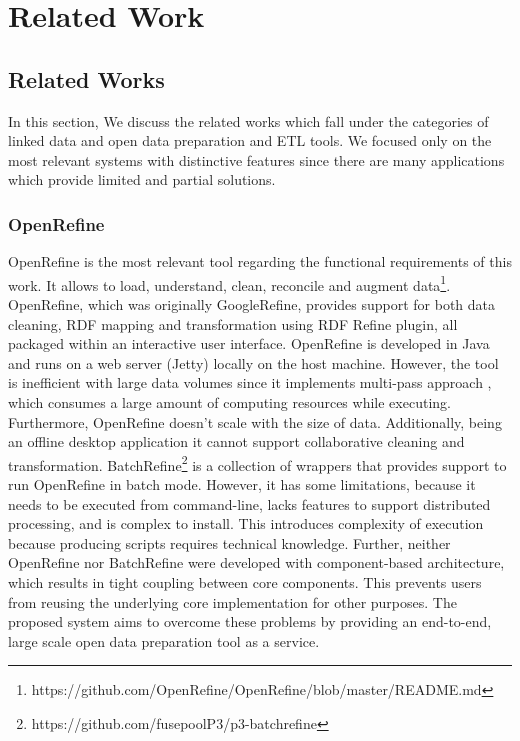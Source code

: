 
\chapter{Related Work} %
\label{Chapter2} %


\section{Related Works}
\label{sec:relatedwork}
In this section, We discuss the related works which fall under the categories of linked data and open data preparation and ETL tools. We focused only on the most relevant systems with distinctive features since there are many applications which provide limited and partial solutions.
\subsection{OpenRefine}
OpenRefine is the most relevant tool regarding the functional requirements of this work. It allows to load, understand, clean, reconcile and augment data\footnote{https://github.com/OpenRefine/OpenRefine/blob/master/README.md}. OpenRefine, which was originally GoogleRefine, provides support for both data cleaning, RDF mapping and transformation using RDF Refine plugin, all packaged within an interactive user interface. OpenRefine is developed in Java and runs on a web server (Jetty) locally on the  host machine. However, the tool is inefficient with large data volumes since it implements multi-pass approach \cite{onestopshotforopendata}, which consumes a large amount of computing resources while executing. Furthermore, OpenRefine doesn't scale with the size of data. Additionally, being an offline desktop application it cannot support collaborative cleaning and transformation.  BatchRefine\footnote{https://github.com/fusepoolP3/p3-batchrefine} is a collection of wrappers that provides support to run OpenRefine in batch mode. However, it has some limitations, because it needs to be executed from command-line, lacks features to support distributed processing, and is complex to install. This introduces complexity of execution because producing scripts requires technical knowledge. Further, neither OpenRefine nor BatchRefine were developed with component-based architecture, which results in tight coupling between core components. This prevents users from reusing the underlying core implementation for other purposes. The proposed system aims to overcome these problems by providing an end-to-end, large scale open data preparation tool as a service.  
